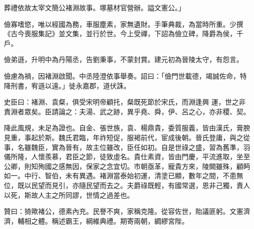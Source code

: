 \begin{pinyinscope}
 葬禮依故太宰文簡公褚淵故事。塚墓材官營辦。謚文憲公。」



 儉寡嗜慾，唯以經國為務，車服塵素，家無遺財。手筆典裁，為當時所重。少撰《古今喪服集記》並文集，並行於世。今上受禪，下詔為儉立碑，降爵為侯，千戶。



 儉弟遜，升明中為丹陽丞，告劉秉事，不蒙封賞。建元初為晉陵太守，有怨言。



 儉慮為禍，因褚淵啟聞。中丞陸澄依事舉奏。詔曰：「儉門世載德，竭誠佐命，特降刑書，宥遜以遠。」徙永嘉郡，道伏誅。



 史臣曰：褚淵、袁粲，俱受宋明帝顧托，粲既死節於宋氏，而淵逢興
 運，世之非責淵者眾矣。臣請論之：夫湯、武之跡，異乎堯、舜，伊、呂之心，亦非稷、契。



 降此風規，未足為證也。自金、張世族，袁、楊鼎貴，委質服義，皆由漢氏，膏腴見重，事起於斯。魏氏君臨，年祚短促，服褐前代，宦成後朝。晉氏登庸，與之從事，名雖魏臣，實為晉有，故主位雖改，臣任如初。自是世祿之盛，習為舊準，羽儀所隆，人懷羨慕，君臣之節，徒致虛名。貴仕素資，皆由門慶，平流進取，坐至公卿，則知殉國之感無因，保家之念宜切。市朝亟革，寵貴方來，陵闕雖殊，顧眄如一。中行、智伯，未有異遇。褚淵當泰始初運，清塗已顯，數年之間，不患無位，既以民望而見引，亦隨民望而去之。夫爵祿既輕，有國常選，恩非己獨，責人以死，斯故人主之所同謬，世情之過差也。



 贊曰：猗歟褚公，德素內充。民譽不爽，家稱克隆。從容佐世，貽議匪躬。文憲濟濟，輔相之體。稱述霸王，綱維典禮。期寄兩朝，綢繆宮陛。



\end{pinyinscope}